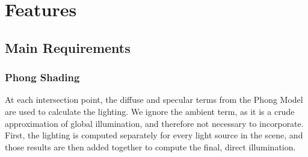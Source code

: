 \documentclass{article}
\begin{document}
    \newpage

    \section{Features}
    \subsection{Main Requirements}
    \subsubsection{Phong Shading}
    At each intersection point, the diffuse and specular terms from the Phong Model are used to calculate the 
    lighting. We ignore the ambient term, as it is a crude approximation of global illumination, and therefore 
    not necessary to incorporate. First, the lighting is computed separately for every light source in the 
    scene, and those results are then added together to compute the final, direct illumination.
\end{document}
